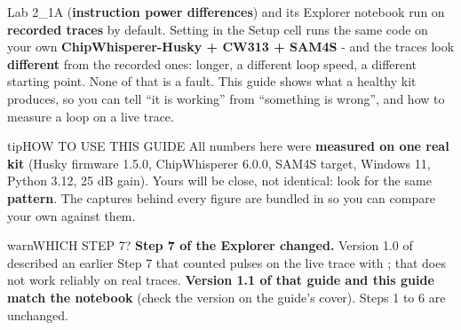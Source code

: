 \documentclass[11pt,letterpaper]{article}
\begin{document}

Lab 2\_1A (\textbf{instruction power differences}) and its Explorer notebook run on \textbf{recorded traces} by
default. Setting  in the Setup cell runs the same code on your own
\textbf{ChipWhisperer-Husky + CW313 + SAM4S} - and the traces look \textbf{different} from the recorded ones: longer,
a different loop speed, a different starting point. None of that is a fault. This guide shows what a healthy kit
produces, so you can tell ``it is working'' from ``something is wrong'', and how to measure a loop on a live trace.

\vspace{10pt}

\begin{guidecallout}{tip}{HOW TO USE THIS GUIDE}
All numbers here were \textbf{measured on one real kit} (Husky firmware 1.5.0, ChipWhisperer 6.0.0, SAM4S target,
Windows 11, Python 3.12, 25 dB gain). Yours will be close, not identical: look for the same \textbf{pattern}. The
captures behind every figure are bundled in
 so you can compare your own
against them.
\end{guidecallout}

\begin{guidecallout}{warn}{WHICH STEP 7?}
\textbf{Step 7 of the Explorer changed.} Version 1.0 of 
described an earlier Step 7 that counted pulses on the live trace with ; that does not work
reliably on real traces. \textbf{Version 1.1 of that guide and this guide match the notebook} (check the version on
the guide's cover). Steps 1 to 6 are unchanged.
\end{guidecallout}

\end{document}

